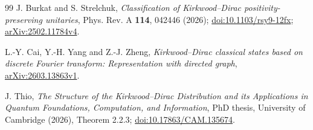 \documentclass[11pt,a4paper]{article}
\theoremstyle{definition}
\theoremstyle{plain}
\begin{document}
\begin{thebibliography}{99}
J. Burkat and S. Strelchuk,
\emph{Classification of Kirkwood--Dirac positivity-preserving unitaries},
Phys. Rev. A \textbf{114}, 042446 (2026);
\href{https://doi.org/10.1103/rsy9-12fx}{doi:10.1103/rsy9-12fx};
\href{https://arxiv.org/abs/2502.11784v4}{arXiv:2502.11784v4}.

L.-Y. Cai, Y.-H. Yang and Z.-J. Zheng,
\emph{Kirkwood--Dirac classical states based on discrete Fourier transform:
Representation with directed graph},
\href{https://arxiv.org/abs/2603.13863v1}{arXiv:2603.13863v1}.

J. Thio,
\emph{The Structure of the Kirkwood--Dirac Distribution and its Applications
in Quantum Foundations, Computation, and Information},
PhD thesis, University of Cambridge (2026), Theorem 2.2.3;
\href{https://doi.org/10.17863/CAM.135674}{doi:10.17863/CAM.135674}.
\end{thebibliography}
\endgroup
\end{document}

